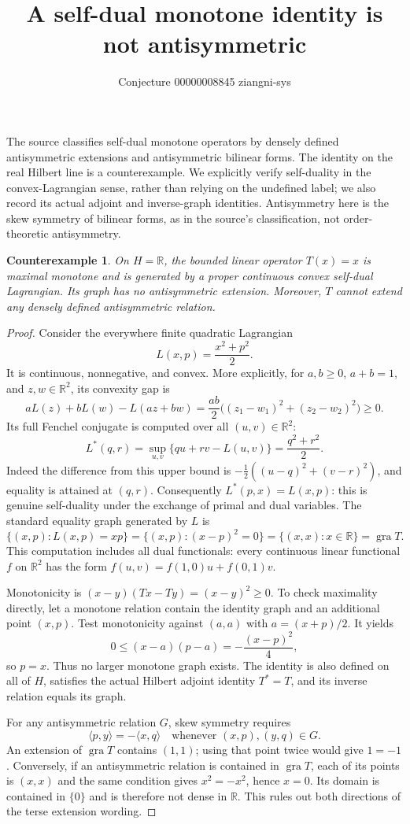 \documentclass[11pt]{article}
\title{A self-dual monotone identity is not antisymmetric}
\author{Conjecture 00000008845 \quad ziangni-sys}
\date{}
\newtheorem*{proposition}{Counterexample}
\begin{document}
\maketitle
The source classifies self-dual monotone operators by densely defined antisymmetric extensions and antisymmetric bilinear forms. The identity on the real Hilbert line is a counterexample. We explicitly verify self-duality in the convex-Lagrangian sense, rather than relying on the undefined label; we also record its actual adjoint and inverse-graph identities. Antisymmetry here is the skew symmetry of bilinear forms, as in the source's classification, not order-theoretic antisymmetry.

\begin{proposition}
On $H=\mathbb R$, the bounded linear operator $T(x)=x$ is maximal monotone and is generated by a proper continuous convex self-dual Lagrangian. Its graph has no antisymmetric extension. Moreover, $T$ cannot extend any densely defined antisymmetric relation.
\end{proposition}
\begin{proof}
Consider the everywhere finite quadratic Lagrangian
\[
 L(x,p)=\frac{x^2+p^2}{2}.
\]
It is continuous, nonnegative, and convex. More explicitly, for $a,b\geq0$, $a+b=1$, and $z,w\in\mathbb R^2$, its convexity gap is
\[
 aL(z)+bL(w)-L(az+bw)
 =\frac{ab}{2}\big((z_1-w_1)^2+(z_2-w_2)^2\big)\geq0.
\]
Its full Fenchel conjugate is computed over all $(u,v)\in\mathbb R^2$:
\[
 L^*(q,r)=\sup_{u,v}\{qu+rv-L(u,v)\}
 =\frac{q^2+r^2}{2}.
\]
Indeed the difference from this upper bound is
$-\tfrac12((u-q)^2+(v-r)^2)$, and equality is attained at $(q,r)$. Consequently $L^*(p,x)=L(x,p)$: this is genuine self-duality under the exchange of primal and dual variables. The standard equality graph generated by $L$ is
\[
 \{(x,p):L(x,p)=xp\}
 =\{(x,p):(x-p)^2=0\}
 =\{(x,x):x\in\mathbb R\}=\operatorname{gra}T.
\]
This computation includes all dual functionals: every continuous linear functional $f$ on $\mathbb R^2$ has the form $f(u,v)=f(1,0)u+f(0,1)v$.

Monotonicity is $(x-y)(Tx-Ty)=(x-y)^2\geq0$. To check maximality directly, let a monotone relation contain the identity graph and an additional point $(x,p)$. Test monotonicity against $(a,a)$ with $a=(x+p)/2$. It yields
\[
 0\leq(x-a)(p-a)=-\frac{(x-p)^2}{4},
\]
so $p=x$. Thus no larger monotone graph exists. The identity is also defined on all of $H$, satisfies the actual Hilbert adjoint identity $T^*=T$, and its inverse relation equals its graph.

For any antisymmetric relation $G$, skew symmetry requires
\[
 \langle p,y\rangle=-\langle x,q\rangle
 \quad\text{whenever }(x,p),(y,q)\in G.
\]
An extension of $\operatorname{gra}T$ contains $(1,1)$; using that point twice would give $1=-1$. Conversely, if an antisymmetric relation is contained in $\operatorname{gra}T$, each of its points is $(x,x)$ and the same condition gives $x^2=-x^2$, hence $x=0$. Its domain is contained in $\{0\}$ and is therefore not dense in $\mathbb R$. This rules out both directions of the terse extension wording.
\end{proof}
\end{document}
